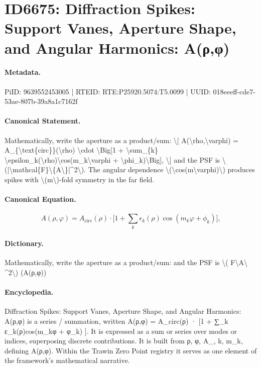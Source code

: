 \section*{ID6675: Diffraction Spikes: Support Vanes, Aperture Shape, and Angular Harmonics: A(ρ,φ)}
\paragraph{Metadata.}
PiID: 9639552453005 | RTEID: RTE:P25920.5074:T5.0099 | UUID: 018eeeff-cde7-53ae-807b-39a8a1c7162f

\paragraph{Canonical Statement.}
Mathematically, write the aperture as a product/sum: \textbackslash{}[ A(\textbackslash{}rho,\textbackslash{}varphi) = A\_\{\textbackslash{}text\{circ\}\}(\textbackslash{}rho) \textbackslash{}cdot \textbackslash{}Big[1 + \textbackslash{}sum\_\{k\} \textbackslash{}epsilon\_k(\textbackslash{}rho)\textbackslash{}cos(m\_k\textbackslash{}varphi + \textbackslash{}phi\_k)\textbackslash{}Big], \textbackslash{}] and the PSF is \textbackslash{}(|\textbackslash{}mathcal\{F\}\textbackslash{}\{A\textbackslash{}\}|\textasciicircum{}2\textbackslash{}). The angular dependence \textbackslash{}(\textbackslash{}cos(m\textbackslash{}varphi)\textbackslash{}) produces spikes with \textbackslash{}(m\textbackslash{})-fold symmetry in the far field.

\paragraph{Canonical Equation.}
\[
A(\rho,\varphi) = A_{\text{circ}}(\rho) \cdot \Big[1 + \sum_{k} \epsilon_k(\rho)\cos(m_k\varphi + \phi_k)\Big],
\]

\paragraph{Dictionary.}
Mathematically, write the aperture as a product/sum: and the PSF is \textbackslash{}( F\textbackslash{}A\textbackslash{} \textasciicircum{}2\textbackslash{}) (A(ρ,φ))

\paragraph{Encyclopedia.}
Diffraction Spikes: Support Vanes, Aperture Shape, and Angular Harmonics: A(ρ,φ) is a series / summation, written A(ρ,φ) = A\_circ(ρ) · [1 + ∑\_k ε\_k(ρ)cos(m\_kφ + φ\_k) ]. It is expressed as a sum or series over modes or indices, superposing discrete contributions. It is built from ρ, φ, A\_, k, m\_k, defining A(ρ,φ). Within the Trawin Zero Point registry it serves as one element of the framework's mathematical narrative.
